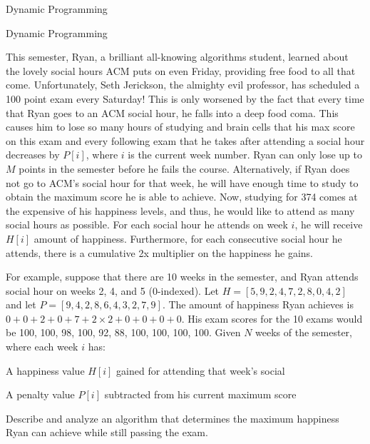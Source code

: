 \documentclass{beamer}
\begin{document}
\begin{frame}[t]{Dynamic Programming}
\end{frame} 

\begin{frame}[t]{Dynamic Programming}
    \large{
    This semester, Ryan, a brilliant all-knowing algorithms student, learned about the lovely social hours ACM puts on even Friday, providing free food to all that come. Unfortunately, Seth Jerickson, the almighty evil professor, has scheduled a 100 point exam every Saturday! This is only worsened by the fact that every time that Ryan goes to an ACM social hour, he falls into a deep food coma. This causes him to lose so many hours of studying and brain cells that his max score on this exam and every following exam that he takes after attending a social hour decreases by $P[i]$, where $i$ is the current week number. Ryan can only lose up to $M$ points in the semester before he fails the course. Alternatively, if Ryan does not go to ACM's social hour for that week, he will have enough time to study to obtain the maximum score he is able to achieve. Now, studying for 374 comes at the expensive of his happiness levels, and thus, he would like to attend as many social hours as possible. For each social hour he attends on week $i$, he will receive $H[i]$ amount of happiness. Furthermore, for each consecutive social hour he attends, there is a cumulative 2x multiplier on the happiness he gains. 
    
    \vspace{.02 \textwidth}
    
    For example, suppose that there are 10 weeks in the semester, and Ryan attends social hour on weeks 2, 4, and 5 (0-indexed). Let $H = [5, 9, 2, 4, 7, 2, 8, 0, 4, 2]$ and let $P = [9, 4, 2, 8, 6, 4, 3, 2, 7, 9]$. The amount of happiness Ryan achieves is $0 + 0 + 2 + 0 + 7 + 2 \times 2 + 0 + 0 + 0 + 0$. His exam scores for the 10 exams would be 100, 100, 98, 100, 92, 88, 100, 100, 100, 100. 
    Given $N$ weeks of the semester, where each week $i$ has:

    \vspace{.02 \textwidth}
    
    \begin{itemize} 
        \large{
        \item A happiness value $H[i]$ gained for attending that week's social
        \item A penalty value $P[i]$ subtracted from his current maximum score
        }
    \end{itemize}

    \vspace{.02 \textwidth}
    
    Describe and analyze an algorithm that determines the maximum happiness Ryan can achieve while still passing the exam.
    }

\end{frame}
\end{document}
